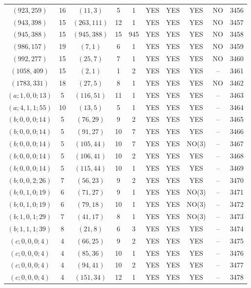 \begin{longtable}{|c|c|c|c|c|c|c|c|c|c|}
$(923, 259)$ & 16 & $(11, 3)$ & 5 & 1 & YES & YES & YES & NO & 3456\\
$(943, 398)$ & 15 & $(263, 111)$ & 12 & 1 & YES & YES & YES & NO & 3457\\
$(945, 388)$ & 15 & $(945, 388)$ & 15 & 945 & YES & YES & YES & NO & 3458\\
$(986, 157)$ & 19 & $(7, 1)$ & 6 & 1 & YES & YES & YES & NO & 3459\\
$(992, 277)$ & 15 & $(25, 7)$ & 7 & 1 & YES & YES & YES & NO & 3460\\
$(1058, 409)$ & 15 & $(2, 1)$ & 1 & 2 & YES & YES & YES & -- & 3461\\
$(1783, 331)$ & 18 & $(27, 5)$ & 8 & 1 & YES & YES & YES & NO & 3462\\
$(a; 1, 0, 0; 13)$ & 5 & $(116, 51)$ & 11 & 1 & YES & YES & YES & -- & 3463\\
$(a; 4, 1, 1; 55)$ & 10 & $(13, 5)$ & 5 & 1 & YES & YES & YES & -- & 3464\\
$(b; 0, 0, 0; 14)$ & 5 & $(76, 29)$ & 9 & 2 & YES & YES & YES & -- & 3465\\
$(b; 0, 0, 0; 14)$ & 5 & $(91, 27)$ & 10 & 7 & YES & YES & YES & -- & 3466\\
$(b; 0, 0, 0; 14)$ & 5 & $(105, 44)$ & 10 & 7 & YES & YES & NO(3) & -- & 3467\\
$(b; 0, 0, 0; 14)$ & 5 & $(106, 41)$ & 10 & 2 & YES & YES & YES & -- & 3468\\
$(b; 0, 0, 0; 14)$ & 5 & $(115, 44)$ & 10 & 1 & YES & YES & YES & -- & 3469\\
$(b; 0, 0, 2; 26)$ & 7 & $(56, 23)$ & 9 & 2 & YES & YES & YES & -- & 3470\\
$(b; 0, 1, 0; 19)$ & 6 & $(71, 27)$ & 9 & 1 & YES & YES & NO(3) & -- & 3471\\
$(b; 0, 1, 0; 19)$ & 6 & $(79, 18)$ & 10 & 1 & YES & YES & NO(3) & -- & 3472\\
$(b; 1, 0, 1; 29)$ & 7 & $(41, 17)$ & 8 & 1 & YES & YES & NO(3) & -- & 3473\\
$(b; 1, 1, 1; 39)$ & 8 & $(21, 8)$ & 6 & 3 & YES & YES & YES & -- & 3474\\
$(c; 0, 0, 0; 4)$ & 4 & $(66, 25)$ & 9 & 2 & YES & YES & YES & -- & 3475\\
$(c; 0, 0, 0; 4)$ & 4 & $(85, 36)$ & 10 & 1 & YES & YES & YES & -- & 3476\\
$(c; 0, 0, 0; 4)$ & 4 & $(94, 41)$ & 10 & 2 & YES & YES & YES & -- & 3477\\
$(c; 0, 0, 0; 4)$ & 4 & $(151, 34)$ & 12 & 1 & YES & YES & YES & -- & 3478\\

\end{longtable}
